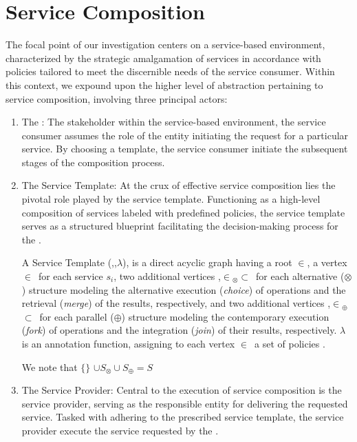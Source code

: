 \section{Service Composition}
The focal point of our investigation centers on a service-based environment, characterized by the strategic amalgamation of services in accordance with policies tailored to meet the discernible needs of the service consumer. Within this context, we expound upon the higher level of abstraction pertaining to service composition, involving three principal actors:
\begin{enumerate}
  \item The \User:
        The stakeholder within the service-based environment,
        the service consumer assumes the role of the entity initiating the request for a particular service.
        By choosing a template, the service consumer initiate the subsequent stages of the composition process.
  \item The Service Template:
        At the crux of effective service composition lies the pivotal role played by the service template.
        Functioning as a high-level composition of services labeled with predefined policies,
        the service template serves as a structured blueprint facilitating the decision-making process for the  \user.
        \begin{definition} \label{def:pipeline}
          A Service Template \T(\V,\E,$\lambda$), is a direct acyclic graph having a root $\in$\V, a vertex $\in$\V\ for each service $s_i$,
          two additional vertices ,$\in$\V$_{\otimes}$$\subset$\V\ for each alternative ($\otimes$) structure modeling the alternative execution (\emph{choice}) of operations and the retrieval (\emph{merge}) of the results,
                respectively, and two additional vertices ,$\in$\V$_{\oplus}$$\subset$\V\ for each parallel ($\oplus$) structure modeling the contemporary execution (\emph{fork}) of operations and the integration (\emph{join}) of their results, respectively. $\lambda$ is an annotation function, assigning to each vertex $\in$\V\ a set of policies .
        \end{definition}
        We note that $\{$$\}$ $\cup S_\otimes\cup S_\oplus=S$\\
  \item The Service Provider:
        Central to the execution of service composition is the service provider,
        serving as the responsible entity for delivering the requested service.
        Tasked with adhering to the prescribed service template, the service provider execute the service requested by the \user.
\end{enumerate}

